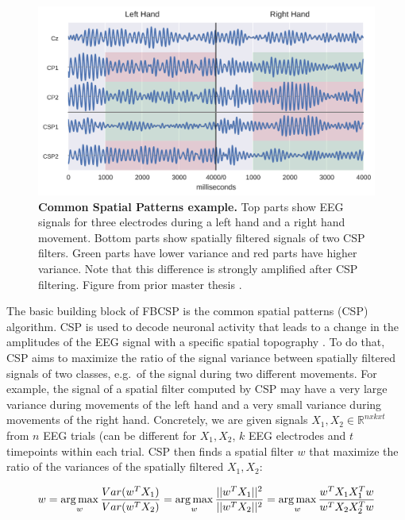 \begin{figure}[ht]
    \myfloatalign
    \includegraphics[width=1\linewidth]{images/Methods_Common_Spatial_Patterns_18_0.png}
    \caption[Common Spatial Patterns example.]{
\textbf{Common Spatial Patterns example.} Top parts show EEG
signals for three electrodes during a left hand and a right hand
movement. Bottom parts show spatially filtered signals of two CSP
filters. Green parts have lower variance and red parts have higher
variance. Note that this difference is strongly amplified after CSP
filtering. Figure from prior master thesis
\citep{schirrmeister_msc_thesis_2015}.}\label{csp-figure}
\end{figure}


    The basic building block of FBCSP is the common spatial patterns (CSP)
algorithm. CSP is used to decode neuronal activity that leads to a
change in the amplitudes of the EEG signal with a specific spatial
topography \citep{koles_spatial_1990,ramoser_optimal_2000,blankertz_optimizing_2008}.
To do that, CSP aims to maximize the ratio of the signal variance
between spatially filtered signals of two classes, e.g.~of the signal
during two different movements. For example, the signal of a spatial
filter computed by CSP may have a very large variance during movements
of the left hand and a very small variance during movements of the right
hand. Concretely, we are given signals
$X_{1}, X_{2} \in \mathbb{R}^{n x k x t}$ from $n$ EEG trials (can
be different for $X_1, X_2$, $k$ EEG electrodes and $t$
timepoints within each trial. CSP then finds a spatial filter $w$ that
maximize the ratio of the variances of the spatially filtered
$X_1,X_2$:

\begin{equation*}
w=\operatorname*{arg\,max}_w\frac{Var(w^T X_1)}{Var(w^T X_2)}= \operatorname*{arg\,max}_w\frac{||w^T X_1||^2}{||w^T X_2||^2}=\operatorname*{arg\,max}_w\frac{w^T X_1 X_1^T w}{w^T X_2 X_2^T w}
\end{equation*}

